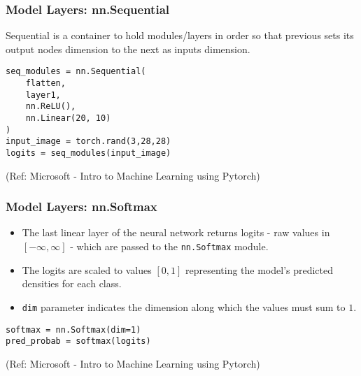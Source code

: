 \begin{frame}[fragile] \frametitle{Model Layers: nn.Sequential}

Sequential is a container to hold modules/layers in order so that previous sets its output nodes dimension to the next as inputs dimension.

\begin{lstlisting}
seq_modules = nn.Sequential(
    flatten,
    layer1,
    nn.ReLU(),
    nn.Linear(20, 10)
)
input_image = torch.rand(3,28,28)
logits = seq_modules(input_image)

\end{lstlisting}

\tiny{(Ref: Microsoft - Intro to Machine Learning using Pytorch)}
\end{frame}
\begin{frame}[fragile] \frametitle{Model Layers: nn.Softmax}

\begin{itemize}
\item The last linear layer of the neural network returns logits - raw values in $[-\infty, \infty]$ - which are passed to the \lstinline|nn.Softmax| module. 
\item The logits are scaled to values $[0, 1]$ representing the model's predicted densities for each class. 
\item \lstinline|dim| parameter indicates the dimension along which the values must sum to $1$.
\end{itemize}

\begin{lstlisting}
softmax = nn.Softmax(dim=1)
pred_probab = softmax(logits)
\end{lstlisting}

\tiny{(Ref: Microsoft - Intro to Machine Learning using Pytorch)}
\end{frame}

